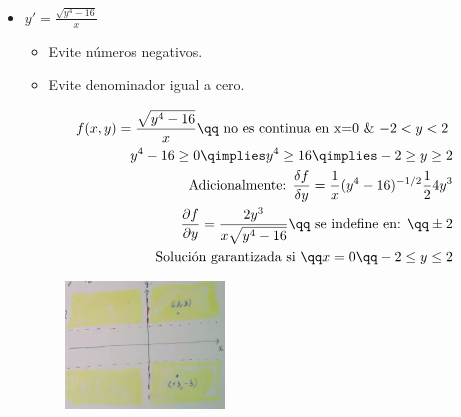 \begin{itemize}
    \item $\displaystyle y'=\frac{\sqrt{y^4-16}}{x}$ 
        \begin{itemize}
            \item Evite números negativos.
            \item Evite denominador igual a cero.
        \end{itemize}
        \begin{center}
           \begin{align*}
               f(x,y) = \frac{\sqrt{y^4-16}}{x} \qq \text{ no es continua en x=0 \& $-2<y<2$ } \\ 
               y^4-16 \geq 0 \qimplies y^4 \geq 16 \qimplies -2\geq y \geq 2 \\ 
               \text{ Adicionalmente: } \frac{\delta f}{\delta y} = \frac{1}{x}(y^4-16)^{-1/2} \frac{1}{2}4y^3 \\ 
               \frac{\partial f}{\partial y} = \frac{2y^3}{x\sqrt{y^4-16}} \qq \text{ se indefine en: }\qq \pm 2 \\ 
               \text{ Solución garantizada si } \qq x=0 \qq -2\leq y \leq2 \\ 
           \end{align*}
           \begin{figure}[H]
               \centering
               \includegraphics[width=0.4\textwidth]{./Figs/2021-01-13-10-47-35.png}
           \end{figure}
        \end{center}
\end{itemize}


